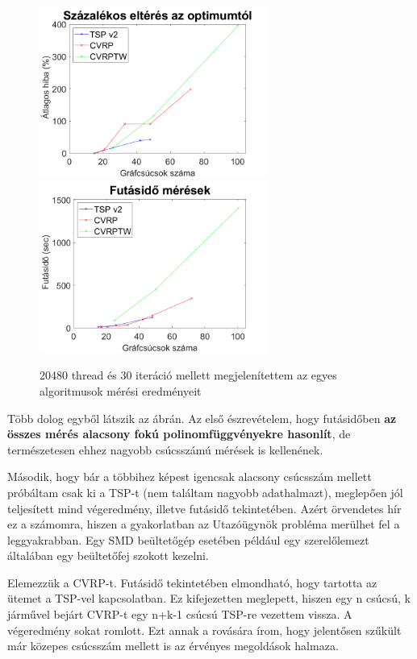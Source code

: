 \begin{figure}[ht!]
	\includegraphics[width=75mm, keepaspectratio]{figures/allVRP-benchmark-error.png}
	\includegraphics[width=75mm, keepaspectratio]{figures/allVRP-benchmark-time.png}
	\caption{20480 thread és 30 iteráció mellett megjelenítettem az egyes algoritmusok mérési eredményeit}
	\label{fig:allVRP-benchmark}
\end{figure}

Több dolog egyből látszik az ábrán. Az első észrevételem, hogy futásidőben \textbf{az összes mérés alacsony fokú polinomfüggvényekre hasonlít}, de természetesen ehhez nagyobb csúcsszámú mérések is kellenének. 

Második, hogy bár a többihez képest igencsak alacsony csúcsszám mellett próbáltam csak ki a TSP-t (nem találtam nagyobb adathalmazt), meglepően jól teljesített mind végeredmény, illetve futásidő tekintetében. Azért örvendetes hír ez a számomra, hiszen a gyakorlatban az Utazóügynök probléma merülhet fel a leggyakrabban. Egy SMD beültetőgép esetében például egy szerelőlemezt általában egy beültetőfej szokott kezelni.

Elemezzük a CVRP-t. Futásidő tekintetében elmondható, hogy tartotta az ütemet a TSP-vel kapcsolatban. Ez kifejezetten meglepett, hiszen egy n csúcsú, k járművel bejárt CVRP-t egy n+k-1 csúcsú TSP-re vezettem vissza. A végeredmény sokat romlott. Ezt annak a rovására írom, hogy jelentősen szűkült már közepes csúcsszám mellett is az érvényes megoldások halmaza.

